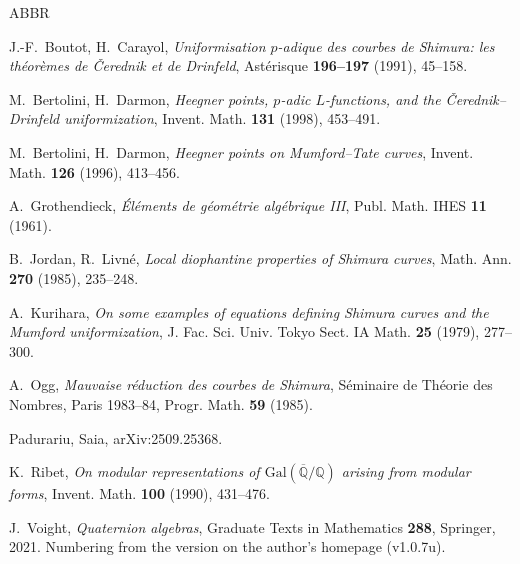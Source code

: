 \documentclass[11pt]{amsart}
\theoremstyle{plain}
\theoremstyle{remark}
\begin{document}
\begin{thebibliography}{ABBR}

J.-F.~Boutot, H.~Carayol,
\emph{Uniformisation $p$-adique des courbes de Shimura: les théorèmes de Čerednik et de Drinfeld},
Astérisque \textbf{196--197} (1991), 45--158.

M.~Bertolini, H.~Darmon,
\emph{Heegner points, $p$-adic $L$-functions, and the \v{C}erednik--Drinfeld uniformization},
Invent. Math. \textbf{131} (1998), 453--491.

M.~Bertolini, H.~Darmon,
\emph{Heegner points on Mumford--Tate curves},
Invent. Math. \textbf{126} (1996), 413--456.

A.~Grothendieck,
\emph{\'El\'ements de g\'eom\'etrie alg\'ebrique III},
Publ. Math. IHES \textbf{11} (1961).

B.~Jordan, R.~Livné,
\emph{Local diophantine properties of Shimura curves},
Math. Ann. \textbf{270} (1985), 235--248.

A.~Kurihara,
\emph{On some examples of equations defining Shimura curves and the Mumford uniformization},
J. Fac. Sci. Univ. Tokyo Sect. IA Math. \textbf{25} (1979), 277--300.

A.~Ogg,
\emph{Mauvaise réduction des courbes de Shimura},
Séminaire de Théorie des Nombres, Paris 1983--84,
Progr. Math. \textbf{59} (1985).

Padurariu, Saia,
arXiv:2509.25368.

K.~Ribet,
\emph{On modular representations of $\mathrm{Gal}(\overline{\mathbb{Q}}/\mathbb{Q})$ arising from modular forms},
Invent. Math. \textbf{100} (1990), 431--476.

J.~Voight,
\emph{Quaternion algebras},
Graduate Texts in Mathematics \textbf{288}, Springer, 2021. Numbering from the version on the author's homepage (v1.0.7u).

\end{thebibliography}
\end{document}
